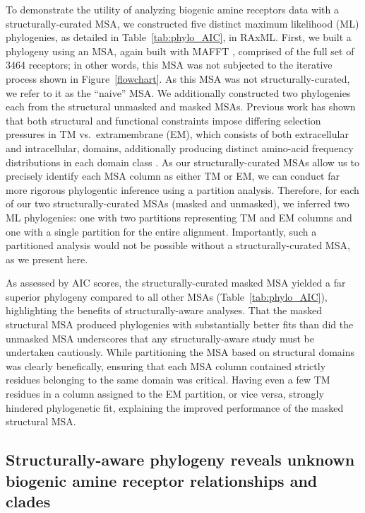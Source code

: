 \documentclass[fleqn,10pt]{wlpeerj}
\begin{document}
To demonstrate the utility of analyzing biogenic amine receptors data with a structurally-curated MSA, we constructed five distinct maximum likelihood (ML) phylogenies, as detailed in Table~\ref{tab:phylo_AIC}, in RAxML. First, we built a phylogeny using an MSA, again built with MAFFT \citep{mafftv7}, comprised of the full set of 3464 receptors; in other words, this MSA was not subjected to the iterative process shown in Figure~\ref{flowchart}. As this MSA was not structurally-curated, we refer to it as the ``naive'' MSA. We additionally constructed two phylogenies each from the structural unmasked and masked MSAs. Previous work has shown that both structural and functional constraints impose differing selection pressures in TM vs.\ extramembrane (EM), which consists of both extracellular and intracellular, domains, additionally producing distinct amino-acid frequency distributions in each domain class \cite{Tourasse2000,Stevens2001,Julenius2006,Oberai2009,SpielmanWilke2013,FranzosaXueXia2013}. As our structurally-curated MSAs allow us to precisely identify each MSA column as either TM or EM, we can conduct far more rigorous phylogentic inference using a partition analysis. Therefore, for each of our two structurally-curated MSAs (masked and unmasked), we inferred two ML phylogenies: one with two partitions representing TM and EM columns and one with a single partition for the entire alignment. Importantly, such a partitioned analysis would not be possible without a structurally-curated MSA, as we present here.

As assessed by AIC scores, the structurally-curated masked MSA yielded a far superior phylogeny compared to all other MSAs (Table~\ref{tab:phylo_AIC}), highlighting the benefits of structurally-aware analyses. That the masked structural MSA produced phylogenies with substantially better fits than did the unmasked MSA underscores that any structurally-aware study must be undertaken cautiously. While partitioning the MSA based on structural domains was clearly benefically, ensuring that each MSA column contained strictly residues belonging to the same domain was critical. Having even a few TM residues in a column assigned to the EM partition, or vice versa, strongly hindered phylogenetic fit, explaining the improved performance of the masked structural MSA.



\subsection*{Structurally-aware phylogeny reveals unknown biogenic amine receptor relationships and clades}
\end{document}
